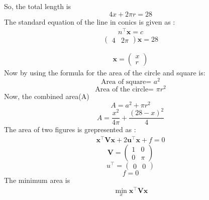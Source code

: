 \documentclass[journal,12pt,twocolumn]{IEEEtran}
\let\vec\mathbf
\newcommand{\myvec}[1]{\ensuremath{\begin{pmatrix}#1\end{pmatrix}}}
\begin{document}
So, the total length is 
\begin{equation}
4x + 2\pi r = 28
\end{equation} 
The standard equation of the line in conics is given as :
\begin{align}
n^\top \vec{x} = c
\end{align}
\begin{equation}
\begin{pmatrix}4 & 2\pi\end{pmatrix}  \vec{x} = 28
\end{equation}

\begin{align}
\vec{x}  = \myvec{x\\r}
\end{align}
Now by using the formula for the area of the circle and square is:
\begin{equation}
\text{Area of square= }a^2
\end{equation}
\begin{equation}
\text{Area of the circle= }\pi r^2
\end{equation}
Now, the combined area(A) 
\begin{equation}
A=a^2+\pi r^2
\end{equation}
\begin{equation}
A = \frac{x^2}{4\pi} + \frac{(28-x)^2}{4}
\end{equation}
The area of two figures is grepresented as :
\begin{align}
\vec{x}^{\top}\vec{V}\vec{x}+2\vec{u}^{\top}\vec{x}+f=0
\end{align}
\begin{equation}
\vec{V} = \begin{pmatrix}
1 & 0 \\
0 & \pi
\end{pmatrix}
\end{equation}
\begin{equation}
u^\top = \begin{pmatrix}
0 & 0
\end{pmatrix}
\end{equation}
\begin{equation}
f = 0
\end{equation}
\noindent The minimum area is 
\begin{align}
\min_{x} \vec{x}^{\top}\vec{V}\vec{x} 
\end{align}
\end{document}
